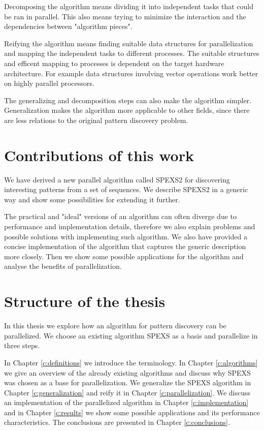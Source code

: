 Decomposing the algorithm means dividing it into independent tasks that could be ran in parallel. This also means trying to minimize the interaction and the dependencies between "algorithm pieces".

Reifying the algorithm means finding suitable data structures for parallelization and mapping the independent tasks to different processes. The suitable structures and efficent mapping to processes is dependent on the target hardware architecture. For example data structures involving vector operations work better on highly parallel processors.

The generalizing and decomposition steps can also make the algorithm simpler. Generalization makes the algorithm more applicable to other fields, since there are less relations to the original pattern discovery problem.

\section{Contributions of this work}

We have derived a new parallel algorithm called SPEXS2 for discovering interesting patterns from a set of sequences. We describe SPEXS2 in a generic way and show some possibilities for extending it further.

The practical and "ideal" versions of an algorithm can often diverge due to performance and implementation details, therefore we also explain problems and possible solutions with implementing such algorithm. We also have provided a concise implementation of the algorithm that captures the generic description more closely. Then we show some possible applications for the algorithm and analyse the benefits of parallelization.

\section{Structure of the thesis}

In this thesis we explore how an algorithm for pattern discovery can be parallelized. We choose an existing algorithm SPEXS\cite{spexs} as a basis and parallelize in three steps.\hmm

In Chapter \ref{c:definitions} we introduce the terminology. In Chapter \ref{c:algorithms} we give an overview of the already existing algorithms and discuss why SPEXS\cite{spexs} was chosen as a base for parallelization. We generalize the SPEXS algorithm in Chapter \ref{c:generalization} and reify it in Chapter \ref{c:parallelization}. We discuss an implementation of the parallelized algorithm in Chapter \ref{c:implementation} and in Chapter \ref{c:results} we show some possible applications and its performance characteristics. The conclusions are presented in Chapter \ref{c:conclusions}.
